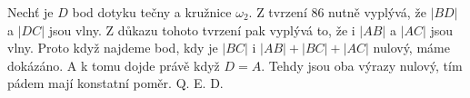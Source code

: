\documentclass{fkssolpub}
\author{Ondřej Sedláček}
\begin{document}
 

Nechť je $D$ bod dotyku tečny a kružnice $\omega_2$. Z tvrzení 86 
nutně vyplývá, že $|BD|$ a $|DC|$ jsou vlny. Z důkazu tohoto tvrzení
pak vyplývá to, že i $|AB|$ a $|AC|$ jsou vlny. Proto když najdeme
bod, kdy je $|BC|$ i $|AB| + |BC| + |AC|$ nulový, máme dokázáno.
A k tomu dojde právě když $D = A$. Tehdy jsou oba výrazy nulový,
tím pádem mají konstatní poměr. Q. E. D.
\end{document}
